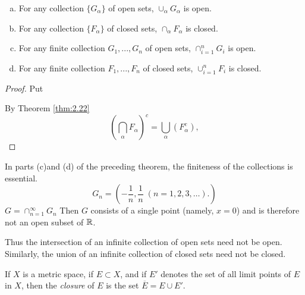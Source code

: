 \begin{thm}
    \label{thm:2.24}
    \begin{enumerate}[(a)]
        \item For any collection $\{G_\alpha\}$ of open sets,  $\cup_\alpha G_\alpha$ is open.
        \item For any collection $\{F_\alpha\}$ of closed sets, $\cap_\alpha F_\alpha$ is closed.
        \item For any finite collection $G_1, ..., G_n$ of open sets, $\cap_{i=1}^n G_i$ is open.
        \item For any finite collection $F_1, ..., F_n$ of closed sets, $\cup_{i=1}^n F_i$ is closed.
    \end{enumerate}
\end{thm}

\begin{proof}
    Put 

    By Theorem \ref{thm:2.22}
    \begin{equation}
        \label{eq:2.21}
        \left( \bigcap_\alpha F_\alpha \right)^c = 
        \bigcup_\alpha \left( F_\alpha^c \right),
    \end{equation}
\end{proof}


\begin{myExample}
    In parts (c)and (d) of the preceding theorem, the finiteness of the collections is essential.
    \begin{equation*}
        G_n = \left(-\frac{1}{n}, \frac{1}{n} \; (n=1,2,3,\dots). \right)
    \end{equation*}
    $G = \cap_{n=1}^\infty G_n$
    Then $G$ consists of a single point (namely, $x = 0$) and is therefore not an open subset of ${\protect\mathbb R}$.
    
    Thus the intersection of an infinite collection of open sets need not be open. Similarly, the union of an infinite collection of closed sets need not be closed.
\end{myExample}

\begin{mydef}
    \label{mydef:2.26}
    If $X$ is a metric space, if $E \subset X$, and if $E'$ denotes the set of all limit points of $E$ in $X$, then the \emph{closure} of $E$ is the set $\overline{E}=E \cup E'$.
\end{mydef}

